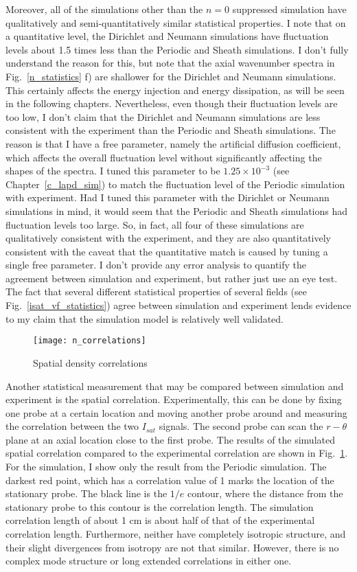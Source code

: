 Moreover, all of the simulations other than the $n=0$ suppressed simulation have qualitatively and semi-quantitatively similar statistical properties. I note that on a quantitative level,
the Dirichlet and Neumann simulations have fluctuation levels about 1.5 times less than the Periodic and Sheath simulations. I don't fully understand the reason for this, but note
that the axial wavenumber spectra in Fig.~\ref{n_statistics} f) are shallower for the Dirichlet and Neumann simulations. This certainly affects the energy injection and energy
dissipation, as will be seen in the following chapters. Nevertheless, even though their fluctuation levels are too low,
I don't claim that the Dirichlet and Neumann simulations are less consistent with the experiment than the
Periodic and Sheath simulations. The reason is that I have a free parameter, namely the artificial
diffusion coefficient, which affects the overall fluctuation level without significantly affecting the shapes of the spectra. I tuned this parameter to be 
$1.25 \times 10^{-3}$ (see Chapter~\ref{c_lapd_sim})
to match the fluctuation level of the Periodic simulation with experiment. Had I tuned this parameter with the Dirichlet or Neumann simulations in mind, it would seem that
the Periodic and Sheath simulations had fluctuation levels too large. So, in fact, all four of these simulations are qualitatively consistent with the experiment, and they are also
quantitatively consistent with the caveat that the quantitative match is caused by tuning a single free parameter. I don't provide any error analysis to quantify the agreement
between simulation and experiment, but rather just use an eye test. The fact that several different statistical properties of several fields (see Fig.~\ref{isat_vf_statistics})
agree between simulation and experiment lends evidence to my claim that the simulation model is relatively well validated.


\begin{figure}[!ht]
\centerline{\texttt{[image: n\_correlations]}}
\caption{Spatial density correlations}
\label{n_correlation}
\end{figure}

Another statistical measurement that may be compared between simulation and experiment is the spatial correlation. Experimentally, this can be done by fixing one probe at a certain
location and moving another probe around and measuring the correlation between the two $I_{sat}$ signals. The second probe can scan the $r-\theta$ plane at an axial location close
to the first probe. The results of the simulated spatial correlation compared to the experimental correlation are shown in Fig.~\ref{n_correlation}. For the simulation, I show only
the result from the Periodic simulation. The darkest red point, which
has a correlation value of 1 marks the location of the stationary probe. The black line is the $1/e$ contour, where the distance from the stationary probe to this contour is
the correlation length. The simulation correlation length of about 1 cm is about half of that of the experimental correlation length. Furthermore, neither have completely isotropic
structure, and their slight divergences from isotropy are not that similar. However, there is no complex mode structure or long extended correlations in either one.

